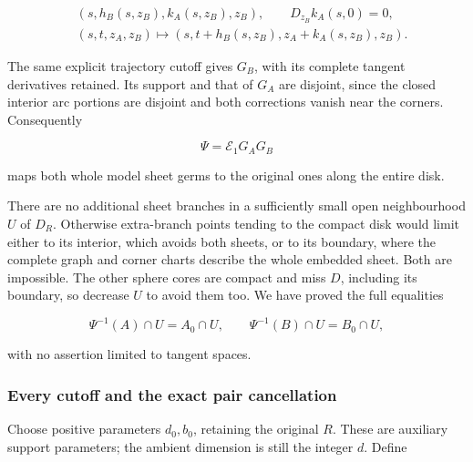 \begin{equation}
\begin{aligned}
 &(s,h_B(s,z_B),k_A(s,z_B),z_B),\qquad
       D_{z_B}k_A(s,0)=0,\\
 &(s,t,z_A,z_B)\longmapsto
       (s,t+h_B(s,z_B),z_A+k_A(s,z_B),z_B).
 \end{aligned}
 \label{courseIII:whitney-moves-in-the-receiving-dimensions:eq:4.10}
\end{equation}

The same explicit trajectory cutoff gives \(G_B\), with its complete tangent derivatives retained. Its support and that of \(G_A\) are disjoint, since the closed interior arc portions are disjoint and both corrections vanish near the corners. Consequently

\begin{equation}
\Psi=\mathcal E_1G_AG_B
 \label{courseIII:whitney-moves-in-the-receiving-dimensions:eq:4.11}
\end{equation}

maps both whole model sheet germs to the original ones along the entire disk.

There are no additional sheet branches in a sufficiently small open neighbourhood \(U\) of \(D_R\). Otherwise extra-branch points tending to the compact disk would limit either to its interior, which avoids both sheets, or to its boundary, where the complete graph and corner charts describe the whole embedded sheet. Both are impossible. The other sphere cores are compact and miss \(D\), including its boundary, so decrease \(U\) to avoid them too. We have proved the full equalities

\begin{equation}
\Psi^{-1}(A)\cap U=A_0\cap U,\qquad
 \Psi^{-1}(B)\cap U=B_0\cap U,
 \label{courseIII:whitney-moves-in-the-receiving-dimensions:eq:4.12}
\end{equation}

with no assertion limited to tangent spaces.

\subsubsection{Every cutoff and the exact pair cancellation}
\label{courseIII:whitney-moves-in-the-receiving-dimensions:section-4.2}

Choose positive parameters \(d_0,b_0\), retaining the original \(R\). These are auxiliary support parameters; the ambient dimension is still the integer \(d\). Define

